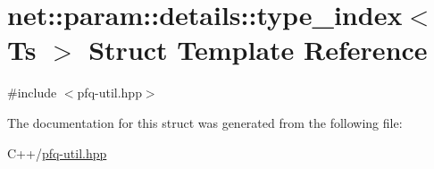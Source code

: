 \hypertarget{structnet_1_1param_1_1details_1_1type__index}{\section{net\+:\+:param\+:\+:details\+:\+:type\+\_\+index$<$ Ts $>$ Struct Template Reference}
\label{structnet_1_1param_1_1details_1_1type__index}
}


{\ttfamily \#include $<$pfq-\/util.\+hpp$>$}



The documentation for this struct was generated from the following file\+:\begin{DoxyCompactItemize}
\item 
C++/\hyperlink{pfq-util_8hpp}{pfq-\/util.\+hpp}\end{DoxyCompactItemize}
